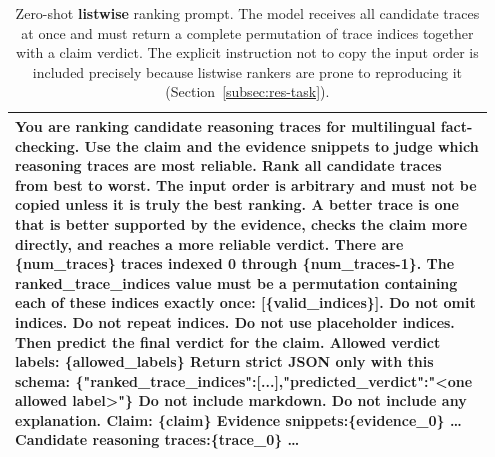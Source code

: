 \begin{table}[htbp]
\centering\small
\begin{tabular}{@{}p{0.95\linewidth}@{}}
\toprule
{\ttfamily\scriptsize
You are ranking candidate reasoning traces for multilingual fact-checking.\newline
Use the claim and the evidence snippets to judge which reasoning traces are most reliable.\newline
Rank all candidate traces from best to worst. The input order is arbitrary and must not be copied unless it is truly the best ranking.\newline
A better trace is one that is better supported by the evidence, checks the claim more directly, and reaches a more reliable verdict.\newline
\newline
There are \{num\_traces\} traces indexed 0 through \{num\_traces-1\}.\newline
The ranked\_trace\_indices value must be a permutation containing each of these indices exactly once: [\{valid\_indices\}].\newline
Do not omit indices. Do not repeat indices. Do not use placeholder indices.\newline
Then predict the final verdict for the claim.\newline
\newline
Allowed verdict labels: \{allowed\_labels\}\newline
\newline
Return strict JSON only with this schema:\newline
\{"ranked\_trace\_indices":[...],"predicted\_verdict":"\textless one allowed label\textgreater"\}\newline
Do not include markdown. Do not include any explanation.\newline
\newline
Claim:\newline
\{claim\}\newline
\newline
Evidence snippets:\newline
[0] \{evidence\_0\} \ldots\newline
\newline
Candidate reasoning traces:\newline
[0] \{trace\_0\} \ldots
} \\
\bottomrule
\end{tabular}
\caption{Zero-shot \textbf{listwise} ranking prompt. The model receives all candidate traces at once
and must return a complete permutation of trace indices together with a claim verdict. The explicit
instruction not to copy the input order is included precisely because listwise rankers are prone to
reproducing it (Section~\ref{subsec:res-task}).}
\label{tab:prompt-listwise}

\end{table}

